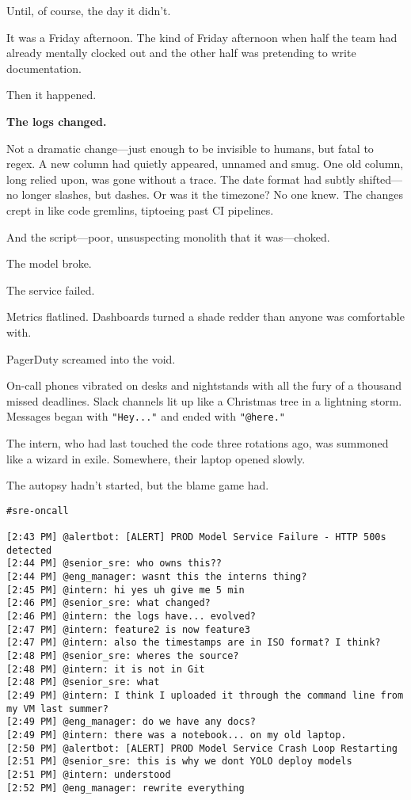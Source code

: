 Until, of course, the day it didn’t.

It was a Friday afternoon. The kind of Friday afternoon when half the team had already mentally clocked out and the other half was pretending to write documentation.

Then it happened.

\textbf{The logs changed.}

Not a dramatic change—just enough to be invisible to humans, but fatal to regex. A new column had quietly appeared, unnamed and smug. One old column, long relied upon, was gone without a trace. The date format had subtly shifted—no longer slashes, but dashes. Or was it the timezone? No one knew. The changes crept in like code gremlins, tiptoeing past CI pipelines.

And the script—poor, unsuspecting monolith that it was—choked.

The model broke.

The service failed.

Metrics flatlined. Dashboards turned a shade redder than anyone was comfortable with.

PagerDuty screamed into the void.

On-call phones vibrated on desks and nightstands with all the fury of a thousand missed deadlines. Slack channels lit up like a Christmas tree in a lightning storm. Messages began with \texttt{"Hey..."} and ended with \texttt{"@here."}

The intern, who had last touched the code three rotations ago, was summoned like a wizard in exile. Somewhere, their laptop opened slowly.

The autopsy hadn’t started, but the blame game had.

\medskip 

\begin{lstlisting}[caption={Slack transcript, 2:43 PM on a Friday}, label={lst:slackpanic}, basicstyle=\ttfamily\small, frame=single]
#sre-oncall

[2:43 PM] @alertbot: [ALERT] PROD Model Service Failure - HTTP 500s detected
[2:44 PM] @senior_sre: who owns this??
[2:44 PM] @eng_manager: wasnt this the interns thing?
[2:45 PM] @intern: hi yes uh give me 5 min
[2:46 PM] @senior_sre: what changed?
[2:46 PM] @intern: the logs have... evolved?
[2:47 PM] @intern: feature2 is now feature3
[2:47 PM] @intern: also the timestamps are in ISO format? I think?
[2:48 PM] @senior_sre: wheres the source?
[2:48 PM] @intern: it is not in Git
[2:48 PM] @senior_sre: what
[2:49 PM] @intern: I think I uploaded it through the command line from my VM last summer?
[2:49 PM] @eng_manager: do we have any docs?
[2:49 PM] @intern: there was a notebook... on my old laptop.
[2:50 PM] @alertbot: [ALERT] PROD Model Service Crash Loop Restarting
[2:51 PM] @senior_sre: this is why we dont YOLO deploy models
[2:51 PM] @intern: understood
[2:52 PM] @eng_manager: rewrite everything
\end{lstlisting}

